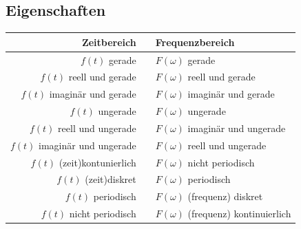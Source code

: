 				
		\subsection{Eigenschaften}
				
					\renewcommand{\arraystretch}{1}					
					\begin{tabular}{|rcl|}
						\hline 
							\textbf{Zeitbereich} & \laplace  & \textbf{Frequenzbereich} \\ 
						\hline 
						\hline
							$f(t)$ gerade & \laplace & $F(\omega)$ gerade  \\ 
						\hline 
							$f(t)$ reell und gerade & \laplace & $F(\omega)$ reell und gerade\\ 
						\hline 
							$f(t)$ imaginär und gerade & \laplace & $F(\omega)$ imaginär und gerade \\ 
						\hline 
							$f(t)$ ungerade & \laplace & $F(\omega)$ ungerade \\ 
						\hline 
							$f(t)$ reell und ungerade & \laplace & $F(\omega)$ imaginär und ungerade \\ 
						\hline 
							$f(t)$ imaginär und ungerade & \laplace & $F(\omega)$ reell und ungerade\\ 
						\hline 
							$f(t)$ (zeit)kontunierlich & \laplace & $F(\omega)$ nicht periodisch \\ 
						\hline 
							$f(t)$ (zeit)diskret & \laplace & $F(\omega)$ periodisch \\ 
						\hline 
							$f(t)$ periodisch & \laplace & $F(\omega)$ (frequenz) diskret\\ 
						\hline 
							$f(t)$ nicht periodisch & \laplace & $F(\omega)$ (frequenz) kontinuierlich\\ 
						\hline 
					\end{tabular}
					\renewcommand{\arraystretch}{\arraystretchOriginal}	
					
